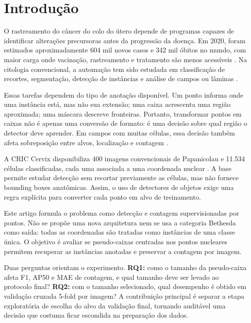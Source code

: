 \section{Introdu\c{c}\~ao}

O rastreamento do c\^ancer do colo do \'utero depende de programas capazes de
identificar altera\c{c}\~oes precursoras antes da progress\~ao da doen\c{c}a. Em
2020, foram estimados aproximadamente 604 mil novos casos e 342 mil \'obitos no
mundo, com maior carga onde vacina\c{c}\~ao, rastreamento e tratamento s\~ao menos
acess\'iveis \cite{singh2023global}. Na citologia convencional, a automa\c{c}\~ao
tem sido estudada em classifica\c{c}\~ao de recortes, segmenta\c{c}\~ao,
detec\c{c}\~ao de inst\^ancias e an\'alise de campos ou l\^aminas
\cite{jiang2023systematic}.

Essas tarefas dependem do tipo de anota\c{c}\~ao dispon\'ivel. Um ponto informa
onde uma inst\^ancia est\'a, mas n\~ao sua extens\~ao; uma caixa acrescenta uma
regi\~ao aproximada; uma m\'ascara descreve fronteiras. Portanto, transformar
pontos em caixas n\~ao \'e apenas uma convers\~ao de formato: \'e uma decis\~ao
sobre qual regi\~ao o detector deve aprender. Em campos com muitas c\'elulas, essa
decis\~ao tamb\'em afeta sobreposi\c{c}\~ao entre alvos, localiza\c{c}\~ao e contagem
\cite{chen2023p2bnet,chen2021sparsepoints,xia2023colorization}.

A CRIC Cervix disponibiliza 400 imagens convencionais de Papanicolau e 11.534
c\'elulas classificadas, cada uma associada a uma coordenada nuclear
\cite{rezende2021cric}. A base permite estudar detec\c{c}\~ao sem recortar
previamente as c\'elulas, mas n\~ao fornece bounding boxes anat\^omicas. Assim, o
uso de detectores de objetos exige uma regra expl\'icita para converter cada
ponto em alvo de treinamento.

Este artigo formula o problema como detec\c{c}\~ao e contagem supervisionadas por
pontos. N\~ao se prop\~oe uma nova arquitetura nem se usa a categoria Bethesda
como sa\'ida: todas as coordenadas s\~ao tratadas como inst\^ancias de uma classe
\'unica. O objetivo \'e avaliar se pseudo-caixas centradas nos pontos nucleares
permitem recuperar as inst\^ancias anotadas e preservar a contagem por imagem.

Duas perguntas orientam o experimento. \textbf{RQ1:} como o tamanho da
pseudo-caixa afeta F1, AP50 e MAE de contagem, e qual tamanho deve ser levado ao
protocolo final? \textbf{RQ2:} com o tamanho selecionado, qual desempenho \'e
obtido em valida\c{c}\~ao cruzada 5-fold por imagem? A contribui\c{c}\~ao principal \'e separar a etapa
explorat\'oria de escolha do alvo da valida\c{c}\~ao final, tornando audit\'avel uma
decis\~ao que costuma ficar escondida na prepara\c{c}\~ao dos dados.

